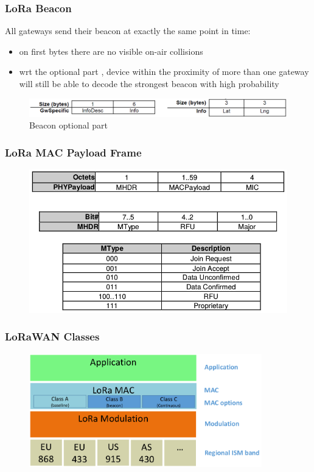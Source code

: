 \begin{frame}[fragile]
	\frametitle{LoRa Beacon}
	All gateways send their beacon at exactly the same point in time:
	\begin{itemize}
		\item on first bytes there are no visible on-air collisions 
		\item wrt the optional part , device within the proximity of more than one
		gateway will still be able to decode the strongest beacon with high probability
	\end{itemize}
	\begin{figure}
		\centering
		\includegraphics[width=\textwidth]{img/optional.png}
		\caption{Beacon optional part}
	\end{figure}
\end{frame}

\begin{frame}[fragile]
  \frametitle{LoRa MAC Payload Frame}
  
 \begin{figure}
  \centering
  \includegraphics[width=\textwidth]{img/mac_frame.png}
  \end{figure}

\end{frame}


\begin{frame}[fragile]
  \frametitle{LoRaWAN Classes}
  \begin{figure}
    \centering
    \includegraphics[width=0.9\textwidth]{img/loraClasses.png}
  \end{figure}
\end{frame}


